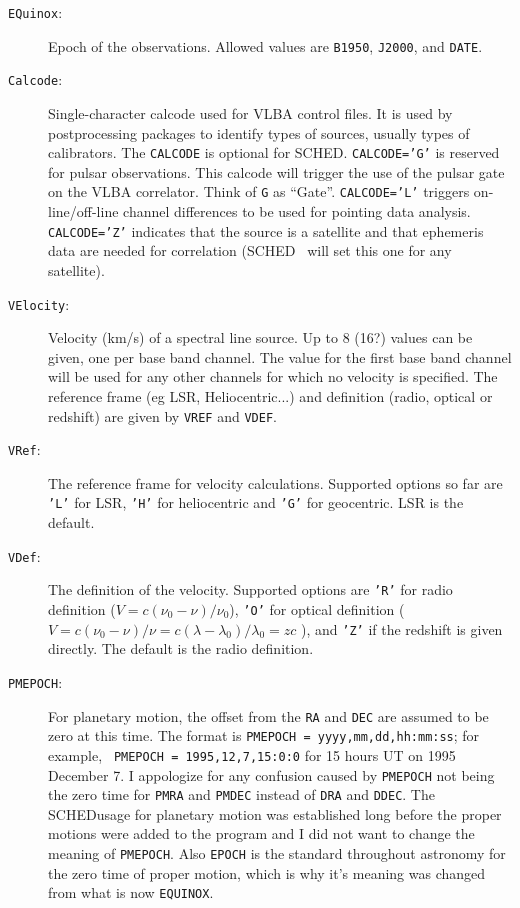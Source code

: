 \documentclass{report}
\newcommand{\sched}{{\sc SCHED}}
\newcommand{\schedb}{{\sc SCHED~}}
\begin{document}
\begin{description}
\item [{\tt EQuinox}:] Epoch of the observations. Allowed values are
{\tt B1950}, {\tt J2000}, and {\tt DATE}.

\item [{\tt Calcode}:] Single-character calcode used for VLBA
control files. It is used by postprocessing packages to identify types
of sources, usually types of calibrators.  The {\tt CALCODE} is
optional for \sched.  {\tt CALCODE='G'} is reserved for pulsar
observations.  This calcode will trigger the use of the pulsar gate on
the VLBA correlator.  Think of {\tt G} as ``Gate''.  {\tt CALCODE='L'}
triggers on-line/off-line channel differences to be used for pointing
data analysis.  {\tt CALCODE='Z'} indicates that the source is a
satellite and that ephemeris data are needed for correlation (\schedb
will set this one for any satellite).

\item [{\tt VElocity}:] Velocity (km/s) of a spectral line
source. Up to 8 (16?) values can be given, one per base band
channel. The value for the first base band channel will be used for
any other channels for which no velocity is specified.  The
reference frame (eg LSR, Heliocentric...) and definition
(radio, optical or redshift) are given by {\tt VREF} and
{\tt VDEF}.

\item [{\tt VRef}:] The reference frame for velocity calculations.
Supported options so far are {\tt 'L'} for LSR, {\tt 'H'}
for heliocentric and {\tt 'G'} for geocentric.  LSR is the default.

\item [{\tt VDef}:] The definition of the velocity.  Supported options
are {\tt 'R'} for radio definition ($ V=c ( \nu_0 - \nu) / \nu_0$),
{\tt 'O'} for optical definition ( $ V= c ( \nu_0 - \nu ) / \nu = c (
\lambda - \lambda_0 ) / \lambda_0 = zc $ ), and {\tt 'Z'} if the
redshift is given directly.  The default is the radio definition.

\item [{\tt PMEPOCH}:] For planetary motion, the offset
from the {\tt RA} and {\tt DEC} are assumed to be zero at this time.
The format is {\tt PMEPOCH = yyyy,mm,dd,hh:mm:ss}; for example, {\tt
PMEPOCH = 1995,12,7,15:0:0} for 15 hours UT on 1995 December 7.
I appologize for any confusion caused by {\tt PMEPOCH} not being the
zero time for {\tt PMRA} and {\tt PMDEC} instead of {\tt DRA} and
{\tt DDEC}.  The \sched usage for planetary motion was established
long before the proper motions were added to the program and I did
not want to change the meaning of {\tt PMEPOCH}.  Also {\tt EPOCH}
is the standard throughout astronomy for the zero time of proper motion,
which is why it's meaning was changed from what is now {\tt EQUINOX}.


\end{description}
\end{document}
